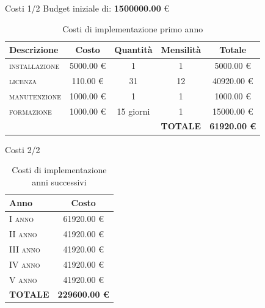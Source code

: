 \begin{frame}{Costi \small{1/2}}
Budget iniziale di: \textbf{1500000.00} \euro{}
\begin{table}
\begin{tabular}{ l | c | c | c | c }
\textbf{Descrizione} & \textbf{Costo} & \textbf{Quantità} & \textbf{Mensilità} & \textbf{Totale}\\
\hline
\hline
\textsc{installazione} & 5000.00 \euro{} & 1 & 1 & 5000.00 \euro{}\\
\textsc{licenza} & 110.00 \euro{} & 31 & 12 & 40920.00 \euro{}\\
\textsc{manutenzione} & 1000.00 \euro{} & 1 & 1 & 1000.00 \euro{}\\
\textsc{formazione} & 1000.00 \euro{} & 15 giorni & 1 & 15000.00 \euro{}\\
& & & \textbf{TOTALE} & \textbf{61920.00 \euro{}}\\
\end{tabular}
\caption{Costi di implementazione primo anno}
\end{table}
\end{frame}

\begin{frame}{Costi \small{2/2}}
\begin{table}
\begin{tabular}{ l | c  }
\textbf{Anno} & \textbf{Costo}\\
\hline
\hline
\textsc{I anno} & 61920.00 \euro{}\\
\textsc{II anno} & 41920.00 \euro{}\\
\textsc{III anno} & 41920.00 \euro{}\\
\textsc{IV anno} & 41920.00 \euro{}\\
\textsc{V anno} & 41920.00 \euro{}\\
\textbf{TOTALE} & \textbf{229600.00 \euro{}}\\
\end{tabular}
\caption{Costi di implementazione anni successivi}
\end{table}
\end{frame}

